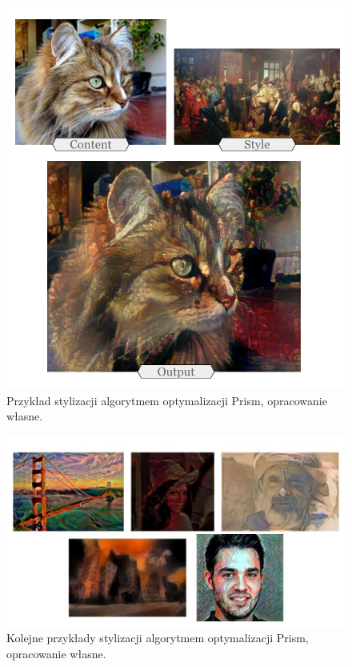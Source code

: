 \documentclass[12pt]{article}
\begin{document}
\begin{figure}[H]
    \centering
    \includegraphics[width=\textwidth]{u17.png}
    \caption{Przykład stylizacji algorytmem optymalizacji Prism, opracowanie własne.}
    \label{fig:13:1}
\end{figure}

\begin{figure}[H]
    \centering
    \includegraphics[width=\textwidth]{u18.png}
    \caption{Kolejne przykłady stylizacji algorytmem optymalizacji Prism, opracowanie własne.}
    \label{fig:13:2}
\end{figure}
\end{document}
